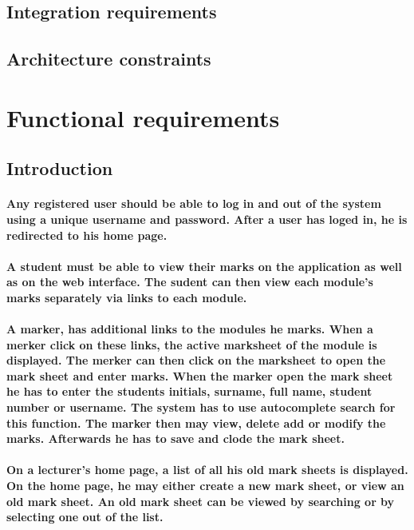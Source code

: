 \documentclass[12pt]{article}
\begin{document}
  \subsection{Integration requirements}
  \subsection{Architecture constraints}
  \section{Functional requirements}
  \subsection{Introduction}
  \paragraph*{Any registered user should be able to log in and out of the system using a unique username and password. After a user has loged in, he is redirected to his home page.}
  \paragraph*{A student must be able to view their marks on the application as well as on  the web interface. The sudent can then view each module's marks separately via links to each module. }
  \paragraph*{A marker, has additional links to the modules he marks. When a merker click on these links, the active marksheet of the module is displayed. The merker can then click on the marksheet to open the mark sheet and enter marks. When the marker open the mark sheet he has to enter the students initials, surname, full name, student number or username. The system has to use autocomplete search for this function. The marker then may view, delete add or modify the marks. Afterwards he has to save and clode the mark sheet.}
  \paragraph*{On a lecturer's home page, a list of all his old mark sheets is displayed. On the home page, he may either create a new mark sheet, or view an old mark sheet. An old mark sheet can be viewed by searching or by selecting one out of the list.}
\end{document}
